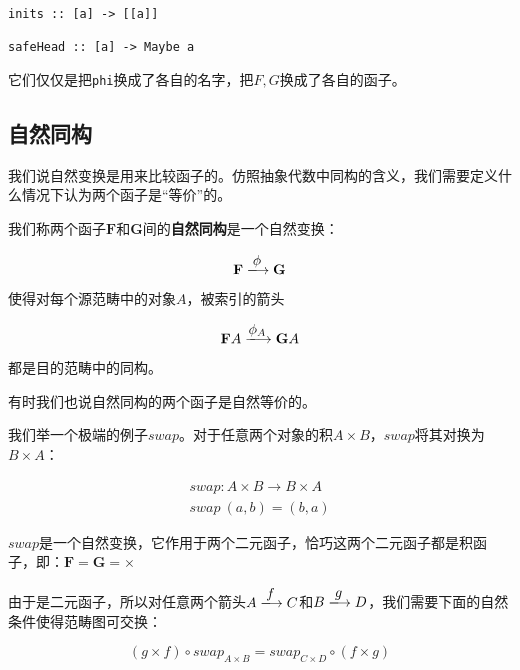 \documentclass{article}
\begin{document}
\begin{lstlisting}
inits :: [a] -> [[a]]

safeHead :: [a] -> Maybe a
\end{lstlisting}

它们仅仅是把\texttt{phi}换成了各自的名字，把$F, G$换成了各自的函子。

\subsection{自然同构}

我们说自然变换是用来比较函子的。仿照抽象代数中同构的含义，我们需要定义什么情况下认为两个函子是“等价”的。

\begin{definition}
我们称两个函子$\mathbf{F}$和$\mathbf{G}$间的\textbf{自然同构}是一个自然变换：

\[
  \mathbf{F} \arrowto{\phi} \mathbf{G}
\]

使得对每个源范畴中的对象$A$，被索引的箭头

\[
  \mathbf{F}A \arrowto{\phi_A} \mathbf{G}A
\]

都是目的范畴中的同构。
\end{definition}

有时我们也说自然同构的两个函子是自然等价的。 %

我们举一个极端的例子$swap$。对于任意两个对象的积$A \times B$，$swap$将其对换为$B \times A$：

\[
\begin{array}{l}
swap : A \times B \to B \times A \\
swap\ (a, b) = (b, a)
\end{array}
\]

$swap$是一个自然变换，它作用于两个二元函子，恰巧这两个二元函子都是积函子，即：$\mathbf{F} = \mathbf{G} = \times$

由于是二元函子，所以对任意两个箭头$A \arrowto{f} C$和$B \arrowto{g} D$，我们需要下面的自然条件使得范畴图可交换：


\[
(g \times f) \circ swap_{A \times B} = swap_{C \times D} \circ (f \times g)
\]

\begin{center}
\end{center}
\end{document}

